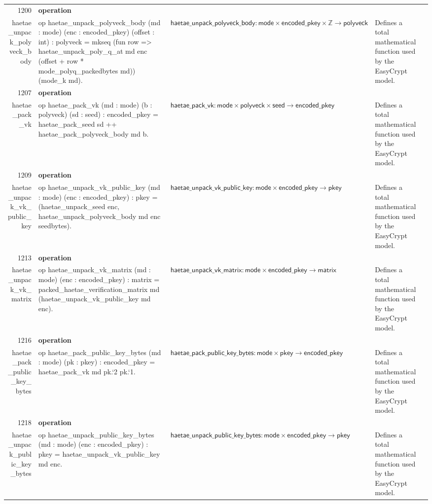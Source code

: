 \documentclass[10pt]{article}
\newcommand{\ec}[1]{\begingroup\ttfamily\scriptsize #1\endgroup}
\begin{document}
\begin{longtable}{r L{0.17\textwidth} L{0.26\textwidth} L{0.27\textwidth} L{0.20\textwidth}}
1200 & \textbf{operation}\\\ec{haetae\_unpack\_polyveck\_body} & \ec{op haetae\_unpack\_polyveck\_body (md : mode) (enc : encoded\_pkey) (offset : int) : polyveck = mkseq (fun row => haetae\_unpack\_poly\_q\_at md enc (offset + row * mode\_polyq\_packedbytes md)) (mode\_k md).} & \(\mathsf{haetae\_unpack\_polyveck\_body} : \mathsf{mode} \times \mathsf{encoded\_pkey} \times \mathbb{Z} \to \mathsf{polyveck}\) & Defines a total mathematical function used by the EasyCrypt model. \\
1207 & \textbf{operation}\\\ec{haetae\_pack\_vk} & \ec{op haetae\_pack\_vk (md : mode) (b : polyveck) (sd : seed) : encoded\_pkey = haetae\_pack\_seed sd ++ haetae\_pack\_polyveck\_body md b.} & \(\mathsf{haetae\_pack\_vk} : \mathsf{mode} \times \mathsf{polyveck} \times \mathsf{seed} \to \mathsf{encoded\_pkey}\) & Defines a total mathematical function used by the EasyCrypt model. \\
1209 & \textbf{operation}\\\ec{haetae\_unpack\_vk\_public\_key} & \ec{op haetae\_unpack\_vk\_public\_key (md : mode) (enc : encoded\_pkey) : pkey = (haetae\_unpack\_seed enc, haetae\_unpack\_polyveck\_body md enc seedbytes).} & \(\mathsf{haetae\_unpack\_vk\_public\_key} : \mathsf{mode} \times \mathsf{encoded\_pkey} \to \mathsf{pkey}\) & Defines a total mathematical function used by the EasyCrypt model. \\
1213 & \textbf{operation}\\\ec{haetae\_unpack\_vk\_matrix} & \ec{op haetae\_unpack\_vk\_matrix (md : mode) (enc : encoded\_pkey) : matrix = packed\_haetae\_verification\_matrix md (haetae\_unpack\_vk\_public\_key md enc).} & \(\mathsf{haetae\_unpack\_vk\_matrix} : \mathsf{mode} \times \mathsf{encoded\_pkey} \to \mathsf{matrix}\) & Defines a total mathematical function used by the EasyCrypt model. \\
1216 & \textbf{operation}\\\ec{haetae\_pack\_public\_key\_bytes} & \ec{op haetae\_pack\_public\_key\_bytes (md : mode) (pk : pkey) : encoded\_pkey = haetae\_pack\_vk md pk.`2 pk.`1.} & \(\mathsf{haetae\_pack\_public\_key\_bytes} : \mathsf{mode} \times \mathsf{pkey} \to \mathsf{encoded\_pkey}\) & Defines a total mathematical function used by the EasyCrypt model. \\
1218 & \textbf{operation}\\\ec{haetae\_unpack\_public\_key\_bytes} & \ec{op haetae\_unpack\_public\_key\_bytes (md : mode) (enc : encoded\_pkey) : pkey = haetae\_unpack\_vk\_public\_key md enc.} & \(\mathsf{haetae\_unpack\_public\_key\_bytes} : \mathsf{mode} \times \mathsf{encoded\_pkey} \to \mathsf{pkey}\) & Defines a total mathematical function used by the EasyCrypt model. \\

\end{longtable}
\end{document}
